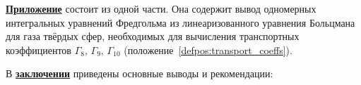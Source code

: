 
\underline{\textbf{Приложение}} состоит из одной части.
Она содержит вывод одномерных интегральных уравнений Фредгольма из линеаризованного уравнения Больцмана
для газа твёрдых сфер, необходимых для вычисления транспортных коэффициентов \(\Gamma_8\), \(\Gamma_9\), \(\Gamma_{10}\)
(положение~\ref{defpos:transport_coeffs}).

В \underline{\textbf{заключении}} приведены основные выводы и рекомендации:




